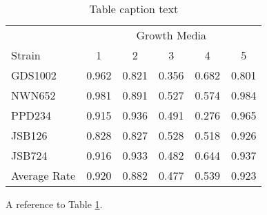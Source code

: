 % 
\begin{table} %
\centering %
\begin{tabular}{l c c c c c} %
\toprule %
& \multicolumn{5}{c}{Growth Media} \\ %
\cmidrule(l){2-6} %
Strain & 1 & 2 & 3 & 4 & 5\\ %
\midrule %
GDS1002 & 0.962 & 0.821 & 0.356 & 0.682 & 0.801\\ %
NWN652 & 0.981 & 0.891 & 0.527 & 0.574 & 0.984\\ %
PPD234 & 0.915 & 0.936 & 0.491 & 0.276 & 0.965\\ %
JSB126 & 0.828 & 0.827 & 0.528 & 0.518 & 0.926\\ %
JSB724 & 0.916 & 0.933 & 0.482 & 0.644 & 0.937\\ %
\midrule %
\midrule %
Average Rate & 0.920 & 0.882 & 0.477 & 0.539 & 0.923\\ %
\bottomrule %
\end{tabular}
\caption{Table caption text} %
\label{tab:template} %
\end{table}

A reference to Table \ref{tab:template}.
% 